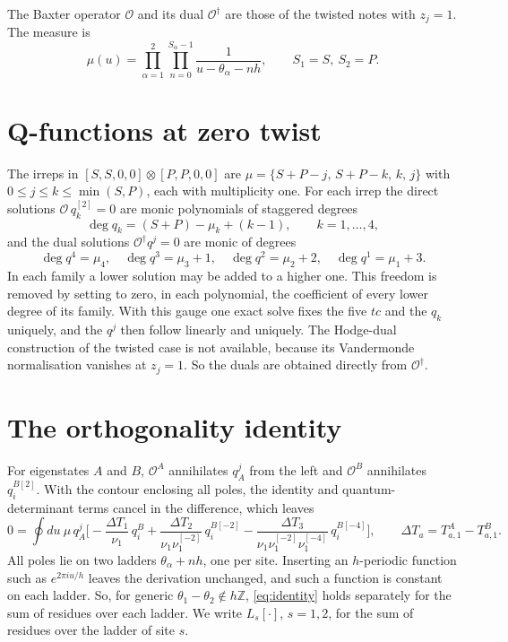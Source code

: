 \documentclass[11pt]{article}
\newcommand{\Op}{\mathcal{O}}
\newcommand{\shift}[1]{^{[#1]}}
\begin{document}
The Baxter operator $\Op$ and its dual $\Op^\dagger$ are those of the twisted notes with $z_j=1$. The
measure is
\begin{equation}
\mu(u)=\prod_{\alpha=1}^2\prod_{n=0}^{S_\alpha-1}\frac{1}{u-\theta_\alpha-nh},\qquad S_1=S,\ S_2=P.
\end{equation}

\section{Q-functions at zero twist}

The irreps in $[S,S,0,0]\otimes[P,P,0,0]$ are $\mu=\{S+P-j,\,S+P-k,\,k,\,j\}$ with
$0\le j\le k\le\min(S,P)$, each with multiplicity one. For each irrep the direct solutions
$\Op\,q_k\shift{2}=0$ are monic polynomials of staggered degrees
\begin{equation}
\deg q_k = (S+P)-\mu_k+(k-1),\qquad k=1,\dots,4,
\end{equation}
and the dual solutions $\Op^\dagger q^j=0$ are monic of degrees
\begin{equation}
\deg q^4=\mu_4,\quad \deg q^3=\mu_3+1,\quad \deg q^2=\mu_2+2,\quad \deg q^1=\mu_1+3.
\end{equation}
In each family a lower solution may be added to a higher one. This freedom is removed by setting to
zero, in each polynomial, the coefficient of every lower degree of its family. With this gauge one
exact solve fixes the five $tc$ and the $q_k$ uniquely, and the $q^j$ then follow linearly and
uniquely. The Hodge-dual construction of the twisted case is not available, because its Vandermonde
normalisation vanishes at $z_j=1$. So the duals are obtained directly from $\Op^\dagger$.

\section{The orthogonality identity}

For eigenstates $A$ and $B$, $\Op^A$ annihilates $q^j_A$ from the left and $\Op^B$ annihilates
$q_i^{B[2]}$. With the contour enclosing all poles, the identity and quantum-determinant terms
cancel in the difference, which leaves
\begin{equation}
0=\oint du\ \mu\,q^j_A\Big[-\frac{\Delta T_1}{\nu_1}\,q^B_i
+\frac{\Delta T_2}{\nu_1\nu_1\shift{-2}}\,q_i^{B[-2]}
-\frac{\Delta T_3}{\nu_1\nu_1\shift{-2}\nu_1\shift{-4}}\,q_i^{B[-4]}\Big],
\qquad \Delta T_a=T^A_{a,1}-T^B_{a,1}.
\label{eq:identity}
\end{equation}
All poles lie on two ladders $\theta_\alpha+nh$, one per site. Inserting an $h$-periodic function
such as $e^{2\pi i u/h}$ leaves the derivation unchanged, and such a function is constant on each
ladder. So, for generic $\theta_1-\theta_2\notin h\mathbb Z$, \eqref{eq:identity} holds separately
for the sum of residues over each ladder. We write $L_s[\cdot]$, $s=1,2$, for the sum of residues
over the ladder of site $s$.
\end{document}
